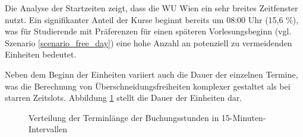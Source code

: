 Die Analyse der Startzeiten zeigt, dass die WU Wien ein sehr breites Zeitfenster nutzt. Ein signifikanter Anteil der Kurse beginnt bereits um 08:00 Uhr (15{,}6 \%), was für Studierende mit Präferenzen für einen späteren Vorlesungsbeginn (vgl. Szenario \ref{scenario_free_day}) eine hohe Anzahl an potenziell zu vermeidenden Einheiten bedeutet.



\newpage



Neben dem Beginn der Einheiten variiert auch die Dauer der einzelnen Termine, was die Berechnung von Überschneidungsfreiheiten komplexer gestaltet als bei starren Zeitslots. Abbildung \ref{fig:descriptive_analysis_offering_duration} stellt die Dauer der Einheiten dar.


\begin{figure}[h]
  \centering
  \caption{Verteilung der Terminlänge der Buchungsstunden in 15-Minuten-Intervallen}
  \label{fig:descriptive_analysis_offering_duration}
\end{figure}

